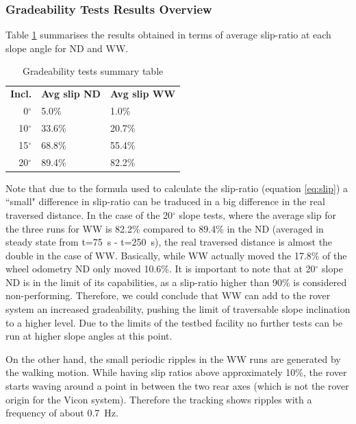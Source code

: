 \documentclass[a4paper,twocolumn]{esapub2005} %
\begin{document}
\subsubsection*{Gradeability Tests Results Overview}
Table \ref{tab:SlopeSummaryTable} summarises the results obtained in terms of average slip-ratio at each slope angle for ND and WW.

\begin{table}[h]
	\begin{tabular}{rll}
	\textbf{Incl.}             & \textbf{Avg slip ND} & \textbf{Avg slip WW} \\
	0$^{\circ}$       & 5.0\%             & 1.0\%             \\
	10$^{\circ}$      & 33.6\%            & 20.7\%            \\
	15$^{\circ}$      & 68.8\%            & 55.4\%            \\
	20$^{\circ}$      & 89.4\%            & 82.2\%                
	\end{tabular}
	\caption{Gradeability tests summary table}
	\label{tab:SlopeSummaryTable}
\end{table}

Note that due to the formula used to calculate the slip-ratio (equation \ref{eq:slip}) a ``small" difference in slip-ratio can be traduced in a big difference in the real traversed distance. In the case of the 20$^{\circ}$ slope tests, where the average slip for the three runs for WW is 82.2\% compared to 89.4\% in the ND (averaged in steady state from t=75~\unit{s} - t=250~\unit{s}), the real traversed distance is almost the double in the case of WW. Basically, while WW actually moved the 17.8\% of the wheel odometry ND only moved 10.6\%. It is important to note that at 20$^{\circ}$ slope ND is in the limit of its capabilities, as a slip-ratio higher than 90\% is considered non-performing. Therefore, we could conclude that WW can add to the rover system an increased gradeability, pushing the limit of traversable slope inclination to a higher level. Due to the limits of the testbed facility no further tests can be run at higher slope angles at this point.

On the other hand, the small periodic ripples in the WW
runs are generated by the walking motion. While having slip ratios above
approximately 10\%, the rover starts waving around a point in between the two
rear axes (which is not the rover origin for the Vicon system). Therefore the tracking shows ripples
with a frequency of about 0.7~\unit{Hz}.
\end{document}
